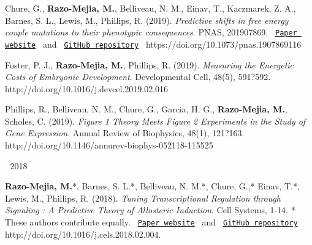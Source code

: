 \begin{cventries}
{      \begin{cvitems} %
        \item {
        \begin{flushleft}
          Chure, G., \textbf{Razo-Mejia, M.}, Belliveau, N. M., Einav, T.,
          Kaczmarek, Z. A., Barnes, S. L., Lewis, M., Phillips, R. (2019).
          \textit{Predictive shifts in free energy couple mutations to their
          phenotypic consequences}. PNAS, 201907869.
          \texttt{
          \href{https://www.rpgroup.caltech.edu/mwc_mutants/}{Paper website} 
          }
          and
          \texttt{
          \href{https://github.com/RPGroup-PBoC/mwc_mutants}{GitHub repository}
          }
          \linebreak
          https://doi.org/10.1073/pnas.1907869116
        \end{flushleft}
        }
        \item {
          \begin{flushleft}
            Foster, P. J., \textbf{Razo-Mejia, M.}, Phillips, R. (2019).
            \textit{Measuring the Energetic Costs of Embryonic Development}.
            Developmental Cell, 48(5), 591?592.\linebreak
            http://doi.org/10.1016/j.devcel.2019.02.016
          \end{flushleft}
        }
        \item {
          \begin{flushleft}
            Phillips, R., Belliveau, N. M., Chure, G., Garcia, H. G.,
            \textbf{Razo-Mejia, M.}, Scholes, C. (2019). \textit{Figure 1
            Theory Meets Figure 2 Experiments in the Study of Gene Expression}.
            Annual Review of Biophysics, 48(1), 121?163.\linebreak
            http://doi.org/10.1146/annurev-biophys-052118-115525
          \end{flushleft}
        }
      \end{cvitems}
    }

\cventry
    {$\;$}
    {2018}
    {$\;$}
    {$\;$}
    {
      \begin{cvitems}
        \item {
        \begin{flushleft}
          \textbf{Razo-Mejia, M.}*, Barnes, S. L.*, Belliveau, N. M.*, Chure,
          G.,* Einav, T.*, Lewis, M., Phillips, R. (2018). \textit{Tuning
          Transcriptional Regulation through Signaling : A Predictive Theory of
          Allosteric Induction}. Cell Systems, 1-14. * These authors contribute
          equally. 
          \texttt{
            \href{http://www.rpgroup.caltech.edu/mwc_induction/}{Paper website} 
            }
            and
            \texttt{
            \href{http://www.github.com/rpgroup-pboc/mwc_induction}{GitHub repository}
            }
          \linebreak
          http://doi.org/10.1016/j.cels.2018.02.004.
        \end{flushleft}
        }
      \end{cvitems}
    }


\end{cventries}
